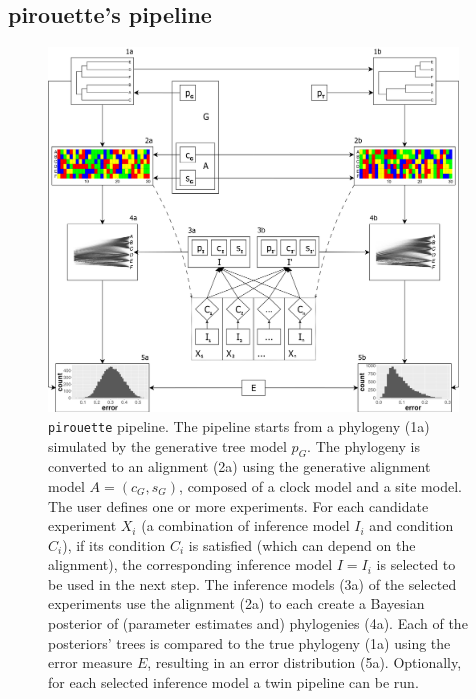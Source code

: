 \subsection{pirouette's pipeline}
\label{subsec:pipeline}

\begin{figure}
  \centering
  \includegraphics[width = 0.97\textwidth]{workflow4.png}
  \caption{
    \texttt{pirouette} pipeline.
    The pipeline starts from a phylogeny (1a) simulated by the 
    generative tree model 
    $\mathit{p_{G}}$.
    The phylogeny is converted to an alignment (2a) using the generative 
    alignment model 
    $\mathit{A} = (\mathit{c_{G}}, \mathit{s_{G}})$, composed of a clock model 
    and a site model. 
    The user defines one or more experiments.
    For each candidate experiment $\mathit{X_{i}}$ 
    (a combination of inference model $\mathit{I_{i}}$ and condition $\mathit{C_{i}}$),
    if its condition $\mathit{C_{i}}$ is 
    satisfied (which can depend on the alignment), 
    the corresponding inference model $\mathit{I} = \mathit{I_{i}}$ is selected
    to be used in the next step.
    The inference models (3a) of the selected experiments use the alignment (2a) 
    to each create a Bayesian posterior of (parameter estimates and) 
    phylogenies (4a). 
    Each of the posteriors' trees is compared to the true phylogeny (1a) 
    using the error measure $\mathit{E}$, 
    resulting in an error distribution (5a). 
    Optionally, for each selected inference model a twin pipeline can be run.
}
\end{figure}
